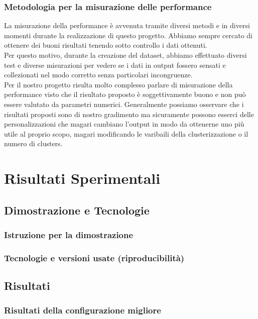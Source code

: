 \documentclass[12pt,a4paper,twoside]{article}
\begin{document}
\subsubsection*{Metodologia per la misurazione delle performance}
La misurazione della performance è avvenuta tramite diversi metodi e in diversi momenti durante la 
realizzazione di questo progetto. Abbiamo sempre cercato di ottenere dei buoni risultati tenendo 
sotto controllo i dati ottenuti.\\
Per questo motivo, durante la creazione del dataset, abbiamo effettuato diversi test e diverse 
misurazioni per vedere se i dati in output fossero sensati e collezionati nel modo corretto senza 
particolari incongruenze.\\
Per il nostro progetto risulta molto complesso parlare di misurazione della performance visto che 
il risultato proposto è soggettivamente buono e non può essere valutato da parametri numerici. 
Generalmente possiamo osservare che i risultati proposti sono di nostro gradimento ma sicuramente 
possono esserci delle personalizzazioni che magari cambiano l'output in modo da ottenerne uno più 
utile al proprio scopo, magari modificando le varibaili della clusterizzazione o il numero di 
clusters.


\newpage
\section{Risultati Sperimentali}

\subsection*{Dimostrazione e Tecnologie}
\subsubsection*{Istruzione per la dimostrazione}
\subsubsection*{Tecnologie e versioni usate (riproducibilità)}

\subsection*{Risultati}
\subsubsection*{Risultati della configurazione migliore}
\end{document}
